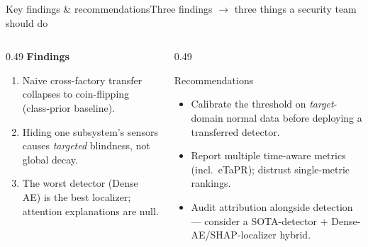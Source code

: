 \documentclass[aspectratio=169,11pt]{beamer}
\begin{document}
\begin{frame}{Key findings \& recommendations}{Three findings $\rightarrow$ three things a security team should do}
\begin{columns}[T]
\begin{column}{0.49\textwidth}
{\color{teal}\bfseries\large Findings}
\begin{enumerate}\small\itemsep6pt
  \item Naive cross-factory transfer collapses to coin-flipping (class-prior baseline).
  \item Hiding one subsystem's sensors causes \emph{targeted} blindness, not global decay.
  \item The worst detector (Dense AE) is the best localizer; attention explanations are null.
\end{enumerate}
\end{column}
\begin{column}{0.49\textwidth}
\begin{block}{\color{navy}Recommendations}
\small
\begin{itemize}\itemsep5pt
  \item[\color{teal}\checkmark] Calibrate the threshold on \emph{target}-domain normal data before deploying a transferred detector.
  \item[\color{teal}\checkmark] Report multiple time-aware metrics (incl.\ eTaPR); distrust single-metric rankings.
  \item[\color{teal}\checkmark] Audit attribution alongside detection --- consider a SOTA-detector + Dense-AE/SHAP-localizer hybrid.
\end{itemize}
\end{block}
\end{column}
\end{columns}
\end{frame}
\end{document}
